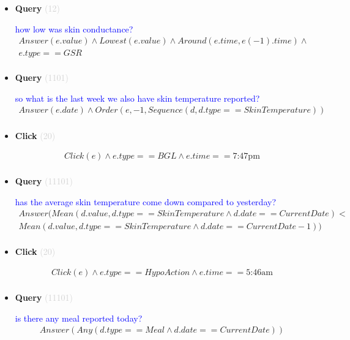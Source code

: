 \documentclass[11pt]{article}
\newcommand{\key}[1]{\textcolor{lightgray}{#1}}
\newcounter{CQuery}
\newcounter{CClick}
\begin{document}
\begin{itemize}
\item
\textbf{Query\theCQuery} \key{(12)} \addtocounter{CQuery}{1}
\textcolor{blue}{ how low was skin conductance? }
\begin{multline*}
Answer(e.value) \wedge Lowest(e.value) \wedge Around(e.time, e(-1).time) \wedge \\ 
e.type==GSR \\ 
\end{multline*}


\item
\textbf{Query\theCQuery} \key{(1101)} \addtocounter{CQuery}{1}
\textcolor{blue}{ so what is the last week we also have skin temperature reported? }
\begin{multline*}
Answer(e.date) \wedge Order(e, -1, Sequence(d, d.type==SkinTemperature)) \\ 
\end{multline*}


\item
\textbf{Click\theCClick} \key{(20)} \addtocounter{CClick}{1}
\textcolor{blue}{  }
\begin{multline*}
Click(e) \wedge e.type==BGL \wedge e.time==\mbox{7:47pm} \\ 
\end{multline*}


\item
\textbf{Query\theCQuery} \key{(11101)} \addtocounter{CQuery}{1}
\textcolor{blue}{ has the average skin temperature come down compared to yesterday? }
\begin{multline*}
Answer(Mean(d.value, d.type==SkinTemperature \wedge d.date==CurrentDate) < \\ 
Mean(d.value, d.type==SkinTemperature \wedge d.date==CurrentDate-1)) \\ 
\end{multline*}


\item
\textbf{Click\theCClick} \key{(20)} \addtocounter{CClick}{1}
\textcolor{blue}{  }
\begin{multline*}
Click(e) \wedge e.type==HypoAction \wedge e.time==\mbox{5:46am} \\ 
\end{multline*}


\item
\textbf{Query\theCQuery} \key{(11101)} \addtocounter{CQuery}{1}
\textcolor{blue}{ is there any meal reported today? }
\begin{multline*}
Answer(Any(d.type==Meal \wedge d.date==CurrentDate)) \\ 
\end{multline*}



\end{itemize}
\end{document}

